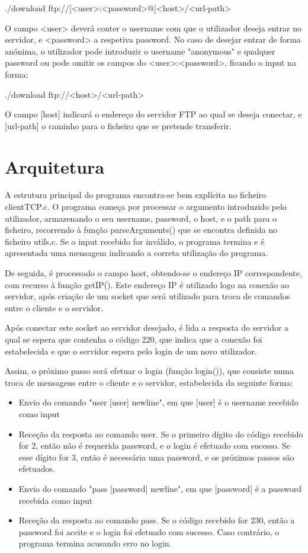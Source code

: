 \documentclass[article, a4paper, 11pt, oneside]{memoir}
\begin{document}
./download ftp://[\textless user\textgreater :\textless password\textgreater @]\textless host\textgreater/\textless url-path\textgreater{}

O campo \textless user\textgreater{} deverá conter o username com que o utilizador deseja entrar no servidor, e \textless password\textgreater{} a respetiva password.
No caso de desejar entrar de forma anónima, o utilizador pode introduzir o username "anonymous" e qualquer password ou
pode omitir os campos do \textless user\textgreater :\textless password\textgreater{}, ficando o input na forma:

./download ftp://\textless host\textgreater /\textless url-path\textgreater{}

O campo [host] indicará o endereço do servidor FTP ao qual se deseja conectar, e [url-path] o caminho para o ficheiro que se pretende transferir.

\section{Arquitetura}

A estrutura principal do programa encontra-se bem explícita no ficheiro clientTCP.c.
O programa começa por processar o argumento introduzido pelo utilizador, armazenando o seu username,
password, o host, e o path para o ficheiro, recorrendo à função parseArguments() que se encontra definida no ficheiro utils.c.
Se o input recebido for inválido, o programa termina e é apresentada uma mensagem indicando a correta utilização do programa.

De seguida, é processado o campo host, obtendo-se o endereço IP correspondente, com recurso à função getIP().
Este endereço IP é utilizado logo na conexão ao servidor, após criação de um socket que será utilizado
para troca de comandos entre o cliente e o servidor.

Após conectar este socket ao servidor desejado, é lida a resposta do servidor a qual se espera que contenha o código 220,
que indica que a conexão foi estabelecida e que o servidor espera pelo login de um novo utilizador. 

Assim, o próximo passo será efetuar o login (função login()), que consiste numa troca de mensagens entre o cliente e o servidor,
estabelecida da seguinte forma:

\begin{itemize}
  \item Envio do comando "user [user] newline", em que [user] é o username recebido como input
  \item Receção da resposta ao comando user. Se o primeiro dígito do código recebido for 2, então não é requerida password, e o login é efetuado com sucesso. Se esse dígito for 3, então é necessária uma password, e os próximos passos são efetuados.
  \item Envio do comando "pass [password] newline", em que [password] é a password recebida como input
  \item Receção da resposta ao comando pass. Se o código recebido for 230, então a password foi aceite e o login foi efetuado com sucesso. Caso contrário, o programa termina acusando erro no login.
\end{itemize}
\end{document}
